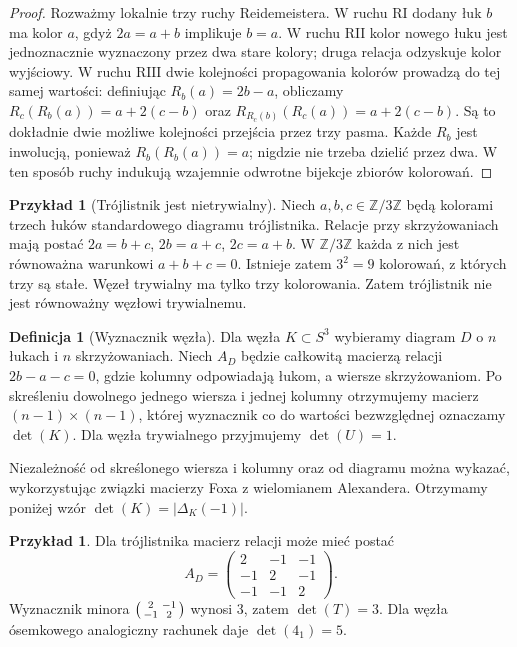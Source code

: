 \documentclass[11pt,a4paper]{report}
\numberwithin{equation}{section}
\theoremstyle{plain}
\theoremstyle{definition}
\newtheorem{definicja}[twierdzenie]{Definicja}
\newtheorem{przyklad}[twierdzenie]{Przykład}
\theoremstyle{remark}
\begin{document}
\begin{proof}
Rozważmy lokalnie trzy ruchy Reidemeistera. W ruchu $\mathrm{R I}$
dodany łuk $b$ ma kolor $a$, gdyż $2a=a+b$ implikuje $b=a$.
W ruchu $\mathrm{R II}$ kolor nowego łuku jest jednoznacznie
wyznaczony przez dwa stare kolory; druga relacja odzyskuje
kolor wyjściowy.
W ruchu $\mathrm{R III}$ dwie kolejności propagowania kolorów
prowadzą do tej samej wartości: definiując $R_b(a)=2b-a$,
obliczamy $R_c(R_b(a))=a+2(c-b)$ oraz
$R_{R_c(b)}(R_c(a))=a+2(c-b)$. Są to dokładnie dwie
możliwe kolejności przejścia przez trzy pasma. Każde $R_b$
jest inwolucją, ponieważ $R_b(R_b(a))=a$; nigdzie nie
trzeba dzielić przez dwa. W ten sposób ruchy indukują
wzajemnie odwrotne bijekcje zbiorów kolorowań.
\end{proof}

\begin{przyklad}[Trójlistnik jest nietrywialny]
Niech $a,b,c\in\mathbb Z/3\mathbb Z$ będą kolorami trzech łuków
standardowego diagramu trójlistnika. Relacje przy skrzyżowaniach
mają postać $2a=b+c$, $2b=a+c$, $2c=a+b$.
W $\mathbb Z/3\mathbb Z$ każda z nich jest równoważna warunkowi
$a+b+c=0$. Istnieje zatem $3^2=9$ kolorowań, z których
trzy są stałe. Węzeł trywialny ma tylko trzy kolorowania.
Zatem trójlistnik nie jest równoważny węzłowi trywialnemu.
\end{przyklad}

\begin{definicja}[Wyznacznik węzła]
Dla węzła $K\subset S^3$ wybieramy diagram $D$ o $n$ łukach
i $n$ skrzyżowaniach. Niech $A_D$ będzie całkowitą macierzą
relacji $2b-a-c=0$, gdzie kolumny odpowiadają łukom, a wiersze
skrzyżowaniom. Po skreśleniu dowolnego jednego wiersza i jednej
kolumny otrzymujemy macierz $(n-1)\times(n-1)$, której wyznacznik
co do wartości bezwzględnej oznaczamy $\det(K)$.
Dla węzła trywialnego przyjmujemy $\det(U)=1$.
\end{definicja}

Niezależność od skreślonego wiersza i kolumny oraz od diagramu
można wykazać, wykorzystując związki macierzy Foxa z wielomianem
Alexandera. Otrzymamy poniżej wzór $\det(K)=|\Delta_K(-1)|$.

\begin{przyklad}
Dla trójlistnika macierz relacji może mieć postać
\[
A_D=\begin{pmatrix}2&-1&-1\\-1&2&-1\\-1&-1&2\end{pmatrix}.
\]
Wyznacznik minora $\begin{psmallmatrix}2&-1\\-1&2\end{psmallmatrix}$
wynosi $3$, zatem $\det(T)=3$. Dla węzła ósemkowego
analogiczny rachunek daje $\det(4_1)=5$.
\end{przyklad}
\end{document}
